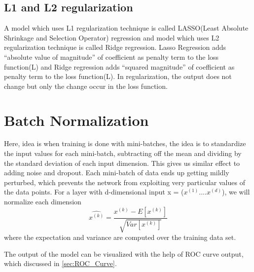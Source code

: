 \subsection{L1 and L2 regularization }
A model which uses L1 regularization technique is called LASSO(Least Absolute Shrinkage and Selection Operator) regression and model which uses L2 regularization technique is called Ridge regression. Lasso Regression adds “absolute value of magnitude” of coefficient as penalty term to the loss function(L) and Ridge regression adds “squared magnitude” of coefficient as penalty term to the loss function(L). In regularization, the output does not change but only the change occur in the loss function\cite{10.1145/1015330.1015435}.


\section{Batch Normalization}\label{sec:Batch_Normal}
Here, idea is when training is done with mini-batches, the idea is to standardize the input values for each mini-batch, subtracting off the mean and dividing by the standard deviation of each input dimension. This gives us similar effect to adding noise and dropout. Each mini-batch of data ends up getting mildly perturbed, which prevents the network from exploiting very particular values of the data points\cite{https://doi.org/10.48550/arxiv.1502.03167}. For a layer with d-dimensional input x = ($x^{(1)}....x^{(d)}$), we will normalize each dimension
\begin{equation}
    \hat{x^{(k)}} = \frac{x^{(k)} - E[x^{(k)}]}{\sqrt{Var[x^{(k)}]}}
\end{equation}
where the expectation and variance are computed over the training data set. 

The output of the model can be visualized with the help of ROC curve output, which discussed in \autoref{sec:ROC_Curve}. 
